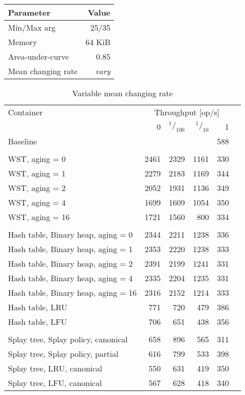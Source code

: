 \pagebreak

\begin{tabular}[h]{l r} \toprule
Parameter & Value \\ \midrule
Min/Max arg & 25/35 \\
Memory & 64 KiB \\
Area-under-curve & 0.85 \\
Mean changing rate & \emph{vary} \\ \bottomrule
\end{tabular}

\begin{table}
\caption{Variable mean changing rate}
\begin{tabular}[]{l r r r r r} \toprule
Container & \multicolumn{4}{c}{Throughput [op/s]} \\ \cmidrule(r){2-5}
& 0 & $^1/_{100}$ & $^1/_{10}$ & 1 \\ \midrule
Baseline & \multicolumn{4}{r}{588}  \\
\\
WST, aging = 0 & 2461 & 2329 & 1161 & 330 \\
WST, aging = 1 & 2279 & 2183 & 1169 & 344 \\
WST, aging = 2 & 2052 & 1931 & 1136 & 349 \\
WST, aging = 4 & 1699 & 1609 & 1054 & 350 \\
WST, aging = 16 & 1721 & 1560 & 800 & 334 \\
\\
Hash table, Binary heap, aging = 0 & 2344 & 2211 & 1238 & 336 \\
Hash table, Binary heap, aging = 1 & 2353 & 2220 & 1238 & 333 \\
Hash table, Binary heap, aging = 2 & 2391 & 2199 & 1241 & 331 \\
Hash table, Binary heap, aging = 4 & 2335 & 2204 & 1235 & 331 \\
Hash table, Binary heap, aging = 16 & 2316 & 2152 & 1214 & 333 \\
Hash table, LRU & 771 & 720 & 479 & 386 \\
Hash table, LFU & 706 & 651 & 438 & 356 \\
\\
Splay tree, Splay policy, canonical & 658 & 896 & 565 & 311 \\
Splay tree, Splay policy, partial & 616 & 799 & 533 & 398 \\
Splay tree, LRU, canonical & 550 & 631 & 419 & 350 \\
Splay tree, LFU, canonical & 567 & 628 & 418 & 340 \\
\bottomrule
\end{tabular}
\end{table}

